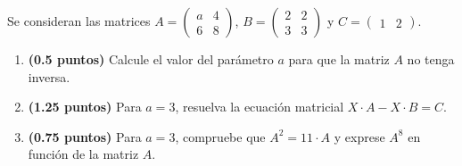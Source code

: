 
Se consideran las matrices $A=\begin{pmatrix}a&4\\6&8\end{pmatrix}$,
$B=\begin{pmatrix}2&2\\3&3\end{pmatrix}$ y $C=\begin{pmatrix}1&2\end{pmatrix}$.
\begin{enumerate}[label=\alph*)]
  \item \textbf{(0.5 puntos)} Calcule el valor del parámetro $a$ para que
  la matriz $A$ no tenga inversa.
  \item \textbf{(1.25 puntos)} Para $a=3$, resuelva la ecuación matricial
  $X\cdot A-X\cdot B=C$.
  \item \textbf{(0.75 puntos)} Para $a=3$, compruebe que $A^2=11\cdot A$
  y exprese $A^8$ en función de la matriz $A$.
\end{enumerate}

